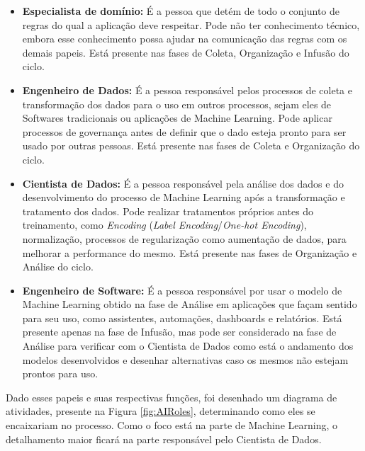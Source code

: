 \documentclass[portugues]{ic-tese}
\begin{document}
\begin{itemize}
\item \textbf{Especialista de domínio:} É a pessoa que detém de todo o conjunto de regras do qual a aplicação deve respeitar. Pode não ter conhecimento técnico, embora esse conhecimento possa ajudar na comunicação das regras com os demais papeis. Está presente nas fases de Coleta, Organização e Infusão do ciclo.

\item \textbf{Engenheiro de Dados:} É a pessoa responsável pelos processos de coleta e transformação dos dados para o uso em outros processos, sejam eles de Softwares tradicionais ou aplicações de Machine Learning. Pode aplicar processos de governança antes de definir que o dado esteja pronto para ser usado por outras pessoas. Está presente nas fases de Coleta e Organização do ciclo.

\item \textbf{Cientista de Dados:} É a pessoa responsável pela análise dos dados e do desenvolvimento do processo de Machine Learning após a transformação e tratamento dos dados. Pode realizar tratamentos próprios antes do treinamento, como \textit{Encoding} (\textit{Label Encoding}/\textit{One-hot Encoding}), normalização, processos de regularização como aumentação de dados, para melhorar a performance do mesmo. Está presente nas fases de Organização e Análise do ciclo.

\item \textbf{Engenheiro de Software:} É a pessoa responsável por usar o modelo de Machine Learning obtido na fase de Análise em aplicações que façam sentido para seu uso, como assistentes, automações, dashboards e relatórios. Está presente apenas na fase de Infusão, mas pode ser considerado na fase de Análise para verificar com o Cientista de Dados como está o andamento dos modelos desenvolvidos e desenhar alternativas caso os mesmos não estejam prontos para uso.

\end{itemize}

Dado esses papeis e suas respectivas funções, foi desenhado um diagrama de atividades, presente na Figura \ref{fig:AIRoles}, determinando como eles se encaixariam no processo. Como o foco está na parte de Machine Learning, o detalhamento maior ficará na parte responsável pelo Cientista de Dados.
\end{document}
